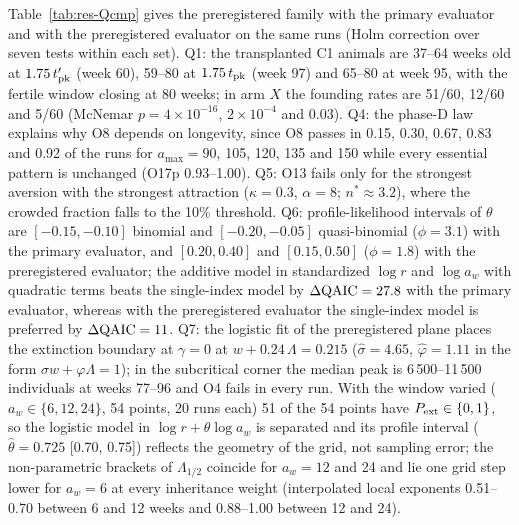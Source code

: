 \documentclass[pre,onecolumn,superscriptaddress,notitlepage]{revtex4-2}
\begin{document}
Table~\ref{tab:res-Qcmp} gives the preregistered family with the primary evaluator and with the preregistered
evaluator on the same runs (Holm correction over seven tests within
each set). Q1: the transplanted \textsf{C1} animals are 37--64 weeks old at $1.75\,t'_{\rm pk}$ (week 60), 59--80 at
$1.75\,t_{\rm pk}$ (week 97) and 65--80 at week 95, with the fertile window closing at 80 weeks; in arm $X$ the
founding rates are 51/60, 12/60 and 5/60 (McNemar $p=4\times10^{-16}$, $2\times10^{-4}$ and $0.03$). Q4: the
phase-D law explains why O8 depends on longevity, since O8 passes in 0.15, 0.30, 0.67, 0.83 and 0.92 of the runs
for $a_{\max}=90$, 105, 120, 135 and 150 while every essential pattern is unchanged (O17p 0.93--1.00). Q5: O13
fails only for the strongest aversion with the strongest attraction ($\kappa=0.3$, $\alpha=8$; $n^*\approx3.2$),
where the crowded fraction falls to the 10\% threshold. Q6: profile-likelihood intervals of $\theta$ are
$[-0.15,-0.10]$ binomial and $[-0.20,-0.05]$ quasi-binomial ($\phi=3.1$) with the primary evaluator, and
$[0.20,0.40]$ and $[0.15,0.50]$ ($\phi=1.8$) with the preregistered evaluator; the additive model in standardized
$\log r$ and $\log a_w$ with quadratic terms beats the single-index model by $\Delta{\rm QAIC}=27.8$ with the
primary evaluator, whereas with the preregistered evaluator the single-index model is preferred by
$\Delta{\rm QAIC}=11$. Q7: the logistic fit of the preregistered plane places the extinction boundary at
$\gamma=0$ at $w+0.24\,\Lambda=0.215$ ($\hat\sigma=4.65$, $\hat\varphi=1.11$ in the form $\sigma w+\varphi\Lambda=1$);
in the subcritical corner the median peak is 6\,500--11\,500 individuals at weeks 77--96 and O4 fails in every
run. With the window varied ($a_w\in\{6,12,24\}$, 54 points, 20 runs each) 51 of the 54 points have
$P_{\rm ext}\in\{0,1\}$, so the logistic model in $\log r+\theta\log a_w$ is separated and its profile interval
($\hat\theta=0.725$ [0.70, 0.75]) reflects the geometry of the grid, not sampling error; the non-parametric
brackets of $\Lambda_{1/2}$ coincide for $a_w=12$ and 24 and lie one grid step lower for $a_w=6$ at every
inheritance weight (interpolated local exponents 0.51--0.70 between 6 and 12 weeks and 0.88--1.00 between 12
and 24).
\end{document}
